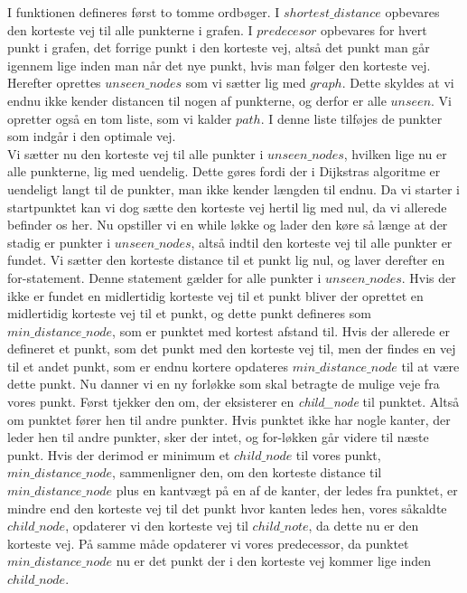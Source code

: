 I funktionen defineres først to tomme ordbøger. I $shortest\_distance$ opbevares den korteste vej til alle punkterne i grafen. I $predecesor$ opbevares for hvert punkt i grafen, det forrige punkt i den korteste vej, altså det punkt man går igennem lige inden man når det nye punkt, hvis man følger den korteste vej. Herefter oprettes $unseen\_nodes$ som vi sætter lig med $graph$. Dette skyldes at vi endnu ikke kender distancen til nogen af punkterne, og derfor er alle $unseen$. Vi opretter også en tom liste, som vi kalder $path$. I denne liste tilføjes de punkter som indgår i den optimale vej.\\
Vi sætter nu den korteste vej til alle punkter i $unseen\_nodes$, hvilken lige nu er alle punkterne, lig med uendelig. Dette gøres fordi der i Dijkstras algoritme er uendeligt langt til de punkter, man ikke kender længden til endnu. Da vi starter i startpunktet kan vi dog sætte den korteste vej hertil lig med nul, da vi allerede befinder os her.
Nu opstiller vi en while løkke og lader den køre så længe at der stadig er punkter i $unseen\_nodes$, altså indtil den korteste vej til alle punkter er fundet.
Vi sætter den korteste distance til et punkt lig nul, og laver derefter en for-statement. Denne statement gælder for alle punkter i $unseen\_nodes$. Hvis der ikke er fundet en midlertidig korteste vej til et punkt bliver der oprettet en midlertidig korteste vej til et punkt, og dette punkt defineres som $min\_distance\_node$, som er punktet med kortest afstand til. Hvis der allerede er defineret et punkt, som det punkt med den korteste vej til, men der findes en vej til et andet punkt, som er endnu kortere opdateres $min\_distance\_node$ til at være dette punkt.
Nu danner vi en ny forløkke som skal betragte de mulige veje fra vores punkt.
Først tjekker den om, der eksisterer en \emph{child\_node} til punktet. Altså om punktet fører hen til andre punkter. Hvis punktet ikke har nogle kanter, der leder hen til andre punkter, sker der intet, og for-løkken går videre til næste punkt.
Hvis der derimod er minimum et $child\_node$ til vores punkt, $min\_distance\_node$, sammenligner den, om den korteste distance til $min\_distance\_node$ plus en kantvægt på en af de kanter, der ledes fra punktet, er mindre end den korteste vej til det punkt hvor kanten ledes hen, vores såkaldte $child\_node$, opdaterer vi den korteste vej til $child\_note$, da dette nu er den korteste vej. På samme måde opdaterer vi vores predecessor, da punktet $min\_distance\_node$ nu er det punkt der i den korteste vej kommer lige inden $child\_node$.\\
